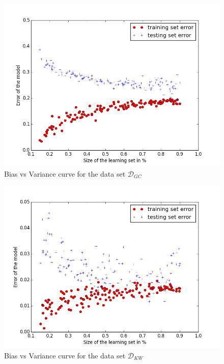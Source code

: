 \begin{figure}[!ht]
  \centering
  \caption{Bias vs Variance curve for the data set  $\mathcal{D}_{GC}$}
  \label{sandalone:bias_vs_variance_1}
    \includegraphics[scale=0.5]{../NLP-standalone-images/BiasVsVarianceD_GC.png}
\end{figure}

\begin{figure}[!ht]
  \centering
  \caption{Bias vs Variance curve for the data set  $\mathcal{D}_{KW}$}
  \label{sandalone:bias_vs_variance_2}
    \includegraphics[scale=0.5]{../NLP-standalone-images/BiasVsVarianceD_KW.png}
\end{figure}

